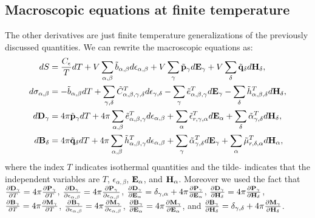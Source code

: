 \documentclass[12pt,a4paper]{article}
\begin{document}
{\subsection{\color{orange}Macroscopic equations at finite temperature}
The other derivatives are just finite temperature generalizations of the
previously discussed quantities. We can rewrite the macroscopic equations as:
\begin{align}
dS&= {C_\epsilon\over T} dT+ V \sum_{\alpha,\beta} \tilde b_{\alpha,\beta} 
d\epsilon_{\alpha,\beta}
+ V \sum_\gamma \tilde {\bf p}_\gamma d{\bf E}_{\gamma} +
V \sum_\delta \tilde {\bf q}_\delta d{\bf H}_{\delta}, \\
d\sigma_{\alpha,\beta}&= -\tilde b_{\alpha,\beta} dT + 
\sum_{\gamma,\delta} \tilde C^T_{\alpha,\beta,\gamma,\delta} 
d \epsilon_{\gamma,\delta} - \sum_\gamma \tilde e^T_{\alpha,\beta,\gamma} 
d{\bf E}_{\gamma} -
\sum_\delta \tilde h^T_{\alpha,\beta,\delta} d{\bf H}_{\delta}, \\
d{\bf D}_\gamma&=
4 \pi \tilde {\bf p}_\gamma dT + 4 \pi \sum_{\alpha,\beta} \tilde 
e^T_{\alpha,\beta,\gamma} d\epsilon_{\alpha,\beta}
+ \sum_\alpha \tilde \epsilon^T_{r,\gamma,\alpha} 
d{\bf E}_{\alpha} + 
\sum_\delta \tilde \alpha^T_{\gamma,\delta} d{\bf H}_{\delta}, 
\label{dcgs} \\
d{\bf B}_\delta&=
4 \pi \tilde {\bf q}_\delta dT+ 4 \pi \sum_{\alpha,\beta}
\tilde h^T_{\alpha,\beta,\gamma}
d\epsilon_{\alpha,\beta}
+ \sum_\gamma \tilde \alpha^T_{\gamma,\delta}
d{\bf E}_{\gamma}+ 
\sum_\alpha \tilde \mu^{T}_{r,\delta,\alpha}
d{\bf H}_{\alpha}, \label{bcgs}
\end{align}
where the index $T$ indicates isothermal quantities and 
the tilde $\tilde{ }$ indicates that the independent variables are
$T$, $\epsilon_{\alpha,\beta}$, ${\bf E}_\alpha$, and ${\bf H}_\alpha$. 
Moreover we used the fact that 
${\partial {\bf D}_\gamma \over \partial T} =
4 \pi {\partial {\bf P}_\gamma \over \partial T}$,
${\partial {\bf D}_\gamma \over \partial \epsilon_{\alpha,\beta}}=
4 \pi {\partial {\bf P}_\gamma \over \partial \epsilon_{\alpha,\beta}}$,
${\partial {\bf D}_\gamma \over \partial {\bf E}_{\alpha}}=  
\delta_{\gamma,\alpha} + 4 \pi 
{\partial {\bf P}_\gamma \over \partial {\bf E}_{\alpha}}$, 
${\partial {\bf D}_\gamma \over \partial {\bf H}_{\delta}}= 
4 \pi {\partial {\bf P}_\gamma \over \partial {\bf H}_{\delta}}$, 
${\partial {\bf B}_\gamma \over \partial T} = 4 \pi
{\partial {\bf M}_\gamma \over \partial T}$,
${\partial {\bf B}_\gamma \over \partial \epsilon_{\alpha,\beta}}= 4 \pi
{\partial {\bf M}_\gamma \over \partial \epsilon_{\alpha,\beta}}$,
${\partial {\bf B}_\gamma \over \partial {\bf E}_{\alpha}}= 4 \pi
{\partial {\bf M}_\gamma \over \partial {\bf E}_{\alpha}}$, and
${\partial {\bf B}_\gamma \over \partial {\bf H}_{\delta}}= 
\delta_{\gamma,\delta} + 4 \pi
{\partial {\bf M}_\gamma \over \partial {\bf H}_{\delta}}$. 

}
\end{document}
